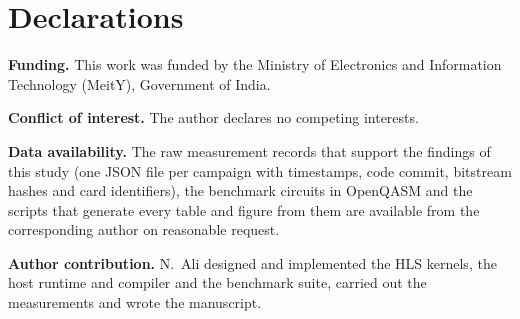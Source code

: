 \documentclass[pdflatex,sn-mathphys-num]{sn-jnl}
\theoremstyle{thmstyleone}
\theoremstyle{thmstylethree}
\begin{document}
\section*{Declarations}

\textbf{Funding.} This work was funded by the Ministry of Electronics and Information Technology (MeitY), Government of India.

\textbf{Conflict of interest.} The author declares no competing interests.

\textbf{Data availability.} The raw measurement records that support the findings of this study (one JSON file per
campaign with timestamps, code commit, bitstream hashes and card identifiers), the benchmark circuits in OpenQASM and
the scripts that generate every table and figure from them are available from the corresponding author on reasonable
request.

\textbf{Author contribution.} N.~Ali designed and implemented the HLS kernels, the host runtime and compiler and the
benchmark suite, carried out the measurements and wrote the manuscript.


\end{document}
